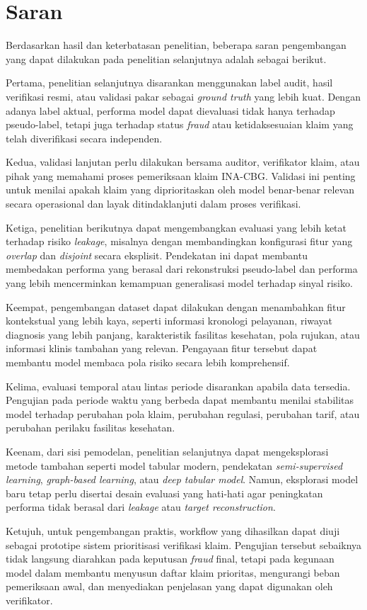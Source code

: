 \section{Saran}\label{saran}

Berdasarkan hasil dan keterbatasan penelitian, beberapa saran pengembangan yang dapat dilakukan pada penelitian selanjutnya adalah sebagai berikut.

Pertama, penelitian selanjutnya disarankan menggunakan label audit, hasil verifikasi resmi, atau validasi pakar sebagai \emph{ground truth} yang lebih kuat. Dengan adanya label aktual, performa model dapat dievaluasi tidak hanya terhadap pseudo-label, tetapi juga terhadap status \emph{fraud} atau ketidaksesuaian klaim yang telah diverifikasi secara independen.

Kedua, validasi lanjutan perlu dilakukan bersama auditor, verifikator klaim, atau pihak yang memahami proses pemeriksaan klaim INA-CBG. Validasi ini penting untuk menilai apakah klaim yang diprioritaskan oleh model benar-benar relevan secara operasional dan layak ditindaklanjuti dalam proses verifikasi.

Ketiga, penelitian berikutnya dapat mengembangkan evaluasi yang lebih ketat terhadap risiko \emph{leakage}, misalnya dengan membandingkan konfigurasi fitur yang \emph{overlap} dan \emph{disjoint} secara eksplisit. Pendekatan ini dapat membantu membedakan performa yang berasal dari rekonstruksi pseudo-label dan performa yang lebih mencerminkan kemampuan generalisasi model terhadap sinyal risiko.

Keempat, pengembangan dataset dapat dilakukan dengan menambahkan fitur kontekstual yang lebih kaya, seperti informasi kronologi pelayanan, riwayat diagnosis yang lebih panjang, karakteristik fasilitas kesehatan, pola rujukan, atau informasi klinis tambahan yang relevan. Pengayaan fitur tersebut dapat membantu model membaca pola risiko secara lebih komprehensif.

Kelima, evaluasi temporal atau lintas periode disarankan apabila data tersedia. Pengujian pada periode waktu yang berbeda dapat membantu menilai stabilitas model terhadap perubahan pola klaim, perubahan regulasi, perubahan tarif, atau perubahan perilaku fasilitas kesehatan.

Keenam, dari sisi pemodelan, penelitian selanjutnya dapat mengeksplorasi metode tambahan seperti model tabular modern, pendekatan \emph{semi-supervised learning}, \emph{graph-based learning}, atau \emph{deep tabular model}. Namun, eksplorasi model baru tetap perlu disertai desain evaluasi yang hati-hati agar peningkatan performa tidak berasal dari \emph{leakage} atau \emph{target reconstruction}.

Ketujuh, untuk pengembangan praktis, workflow yang dihasilkan dapat diuji sebagai prototipe sistem prioritisasi verifikasi klaim. Pengujian tersebut sebaiknya tidak langsung diarahkan pada keputusan \emph{fraud} final, tetapi pada kegunaan model dalam membantu menyusun daftar klaim prioritas, mengurangi beban pemeriksaan awal, dan menyediakan penjelasan yang dapat digunakan oleh verifikator.
